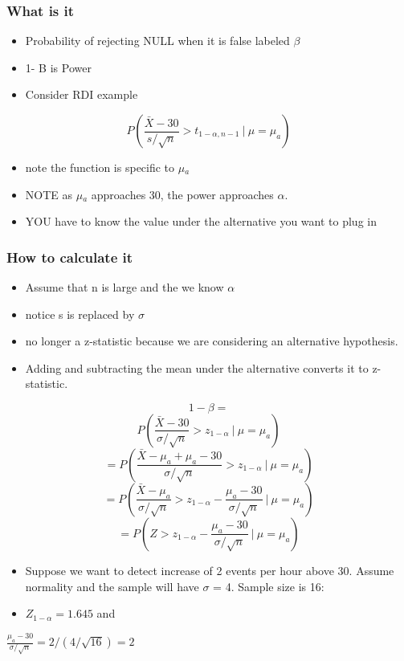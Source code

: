 \documentclass[11pt]{article}
\begin{document}
\subsubsection{What is it}
\label{sec-1-2-1}

\begin{itemize}
\item Probability of rejecting NULL when it is false labeled $\beta$
\item 1- B is Power
\item Consider RDI example
\end{itemize}

$$P\left(\frac{\bar X - 30}{s /\sqrt{n}} > t_{1-\alpha,n-1} ~|~ \mu = \mu_a \right)$$

\begin{itemize}
\item note the function is specific to $\mu$$_a$
\item NOTE as $\mu$$_a$ approaches 30, the power approaches $\alpha$.
\item YOU have to know the value under the alternative you want to plug in
\end{itemize}
\subsubsection{How to calculate it}
\label{sec-1-2-2}

\begin{itemize}
\item Assume that n is large and the we know $\alpha$
\item notice s is replaced by $\sigma$
\item no longer a z-statistic because we are considering an alternative
  hypothesis.
\item Adding and subtracting the mean under the alternative converts it
  to z-statistic.
\end{itemize}

$$1 -\beta  = $$
$$P\left(\frac{\bar X - 30}{\sigma /\sqrt{n}} > z_{1-\alpha} ~|~ \mu = \mu_a \right)$$
$$ =  P\left(\frac{\bar X - \mu_a + \mu_a - 30}{\sigma /\sqrt{n}} > z_{1-\alpha} ~|~ \mu = \mu_a \right)$$
$$ =  P\left(\frac{\bar X - \mu_a}{\sigma /\sqrt{n}} > z_{1-\alpha} - \frac{\mu_a - 30}{\sigma /\sqrt{n}} ~|~ \mu = \mu_a \right)$$
$$ =  P\left(Z > z_{1-\alpha} - \frac{\mu_a - 30}{\sigma /\sqrt{n}}
~|~ \mu = \mu_a \right)$$

\begin{itemize}
\item Suppose we want to detect increase of 2 events per hour
  above 30. Assume normality and the sample will have $\sigma$
  = 4. Sample size is 16:
\item $Z_{1-\alpha} = 1.645$ and
\end{itemize}
$\frac{\mu_a - 30}{\sigma /\sqrt{n}} = 2 / (4 /\sqrt{16}) = 2$ 
\end{document}
